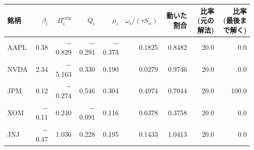 \begin{tabular}{lrrrrrrrr}
\toprule
銘柄 & $\beta_i$ & $\Pi^{\mathrm{orig}}_i$ & $Q_i$ & $\bar\mu_i$ & $\omega_i/(\tau S_{ii})$ & 動いた割合 & 比率 (元の解法) & 比率 (最後まで解く) \\
\midrule
AAPL & 0.38 & \ensuremath{-}0.829 & \ensuremath{-}0.291 & \ensuremath{-}0.373 & 0.1825 & 0.8482 & 20.0 & 0.0 \\
NVDA & 2.34 & \ensuremath{-}5.163 & 0.330 & 0.190 & 0.0279 & 0.9746 & 20.0 & 0.0 \\
JPM & 0.12 & \ensuremath{-}0.274 & 0.546 & 0.304 & 0.4974 & 0.7044 & 20.0 & 100.0 \\
XOM & \ensuremath{-}0.11 & 0.240 & \ensuremath{-}0.091 & 0.116 & 0.6378 & 0.3758 & 20.0 & 0.0 \\
JNJ & \ensuremath{-}0.47 & 1.036 & 0.228 & 0.195 & 0.1433 & 1.0413 & 20.0 & 0.0 \\
\bottomrule
\end{tabular}
